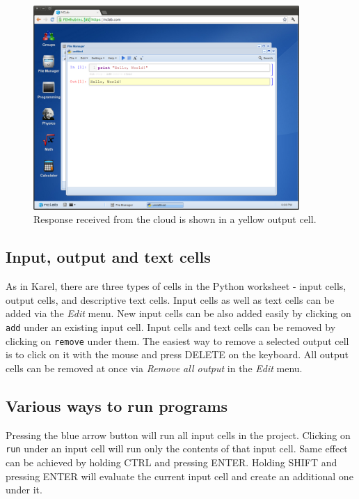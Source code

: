 \newpage

\begin{figure}[!ht]
\begin{center}
\includegraphics[width=0.9\textwidth]{imgp/python-2.png}
\end{center}
\vspace{-2mm}
\caption{Response received from the cloud is shown in a yellow output cell.}
\label{fig:python-2}
\end{figure}

\subsection{Input, output and text cells}

As in Karel, there are three types of cells in the Python worksheet - input cells, output cells, 
and descriptive text cells. Input cells as well as text cells can be added via 
the {\em Edit} menu. New input cells can be also added easily by clicking on {\tt add} under
an existing input cell. Input cells and text cells can be removed by clicking on 
{\tt remove} under them. The easiest way to remove a selected output cell is to 
click on it with the mouse and press DELETE on the keyboard. 
All output cells can be removed at once via {\em Remove all output} in the {\em Edit} menu. 

\subsection{Various ways to run programs}

Pressing the blue arrow button will run all input cells in the project. Clicking 
on {\tt run} under an input cell will run only the contents of that input cell. 
Same effect can be achieved by holding CTRL and pressing ENTER. Holding SHIFT
and pressing ENTER will evaluate the current input cell and create an additional one
under it.

